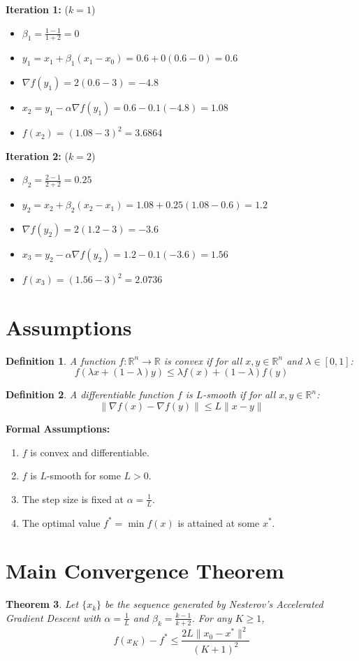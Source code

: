 \documentclass{article}
\newtheorem{theorem}{Theorem}
\newtheorem{definition}[theorem]{Definition}
\begin{document}
\textbf{Iteration 1:} ($k=1$)
\begin{itemize}
\item $\beta_1 = \frac{1-1}{1+2} = 0$
\item $y_1 = x_1 + \beta_1(x_1 - x_0) = 0.6 + 0(0.6 - 0) = 0.6$
\item $\nabla f(y_1) = 2(0.6 - 3) = -4.8$
\item $x_2 = y_1 - \alpha \nabla f(y_1) = 0.6 - 0.1(-4.8) = 1.08$
\item $f(x_2) = (1.08 - 3)^2 = 3.6864$
\end{itemize}

\textbf{Iteration 2:} ($k=2$)
\begin{itemize}
\item $\beta_2 = \frac{2-1}{2+2} = 0.25$
\item $y_2 = x_2 + \beta_2(x_2 - x_1) = 1.08 + 0.25(1.08 - 0.6) = 1.2$
\item $\nabla f(y_2) = 2(1.2 - 3) = -3.6$
\item $x_3 = y_2 - \alpha \nabla f(y_2) = 1.2 - 0.1(-3.6) = 1.56$
\item $f(x_3) = (1.56 - 3)^2 = 2.0736$
\end{itemize}

\section*{Assumptions}
\begin{definition}
A function $f: \mathbb{R}^n \to \mathbb{R}$ is convex if for all $x, y \in \mathbb{R}^n$ and $\lambda \in [0,1]$:
$$f(\lambda x + (1-\lambda)y) \leq \lambda f(x) + (1-\lambda) f(y)$$
\end{definition}
\begin{definition}
A differentiable function $f$ is $L$-smooth if for all $x, y \in \mathbb{R}^n$:
$$\|\nabla f(x) - \nabla f(y)\| \leq L \|x - y\|$$
\end{definition}
\textbf{Formal Assumptions:}
\begin{enumerate}
\item $f$ is convex and differentiable.
\item $f$ is $L$-smooth for some $L > 0$.
\item The step size is fixed at $\alpha = \frac{1}{L}$.
\item The optimal value $f^* = \min f(x)$ is attained at some $x^*$.
\end{enumerate}

\section*{Main Convergence Theorem}
\begin{theorem}
Let $\{x_k\}$ be the sequence generated by Nesterov's Accelerated Gradient Descent with $\alpha = \frac{1}{L}$ and $\beta_k = \frac{k-1}{k+2}$. For any $K \geq 1$,
$$f(x_K) - f^* \leq \frac{2L \|x_0 - x^*\|^2}{(K+1)^2}$$
\end{theorem}
\end{document}
